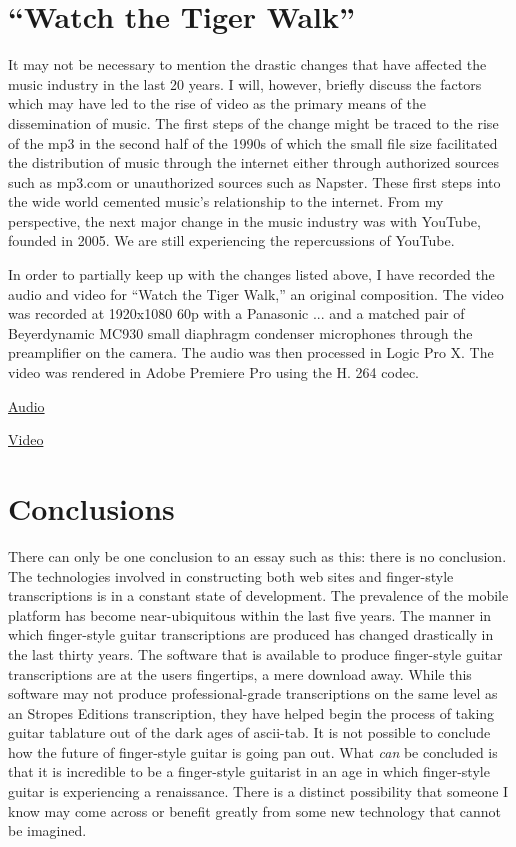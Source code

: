 \documentclass[unicode,hyperfootnotes=false,xetex,colorlinks=true,nofonts,nobib]{tufte-handout}
\begin{document}
\section{``Watch the Tiger Walk''}
\label{sec:watch-tiger-walk}

It may not be necessary to mention the drastic changes that have affected the music industry in the last 20 years. I will, however, briefly discuss the factors which may have led to the rise of video as the primary means of the dissemination of music. The first steps of the change might be traced to the rise of the mp3 in the second half of the 1990s of which the small file size facilitated the distribution of music through the internet either through authorized sources such as mp3.com or unauthorized sources such as Napster. These first steps into the wide world cemented music's relationship to the internet. From my perspective, the next major change in the music industry was with YouTube, founded in 2005. We are still experiencing the repercussions of YouTube.

In order to partially keep up with the changes listed above, I have recorded the audio and video for ``Watch the Tiger Walk,'' an original composition. The video was recorded at 1920x1080 60p with a Panasonic ... and a matched pair of Beyerdynamic MC930 small diaphragm condenser microphones through the preamplifier on the camera. The audio was then processed in Logic Pro X. The video was rendered in Adobe Premiere Pro using the H. 264 codec.

\noindent \href{run:Road.mp3}{Audio}

\noindent\href{run:creativeCommons.mp4}{Video}

\section{Conclusions}
\label{sec:conclusions}

There can only be one conclusion to an essay such as this: there is no conclusion. The technologies involved in constructing both web sites and finger-style transcriptions is in a constant state of development. The prevalence of the mobile platform has become near-ubiquitous within the last five years. The manner in which finger-style guitar transcriptions are produced has changed drastically in the last thirty years. The software that is available to produce finger-style guitar transcriptions are at the users fingertips, a mere download away. While this software may not produce professional-grade transcriptions on the same level as an Stropes Editions transcription, they have helped begin the process of taking guitar tablature out of the dark ages of ascii-tab. It is not possible to conclude how the future of finger-style guitar is going pan out. What \emph{can} be concluded is that it is incredible to be a finger-style guitarist in an age in which finger-style guitar is experiencing a renaissance. There is a distinct possibility that someone I know may come across or benefit greatly from some new technology that cannot be imagined.
\end{document}
